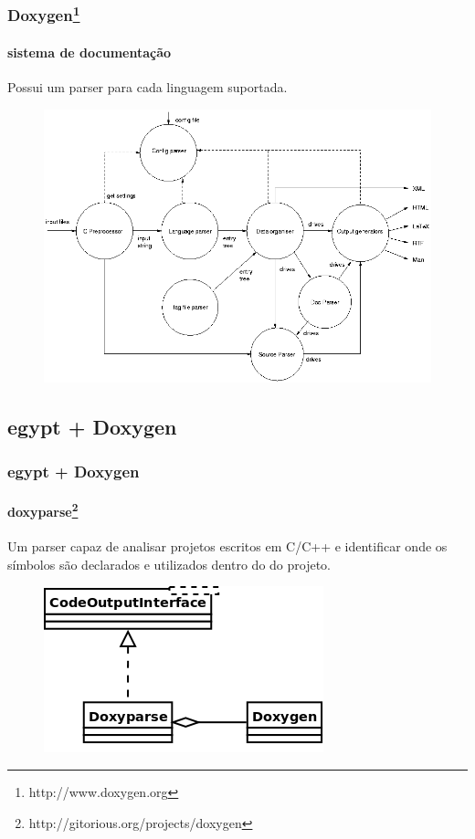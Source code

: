 \documentclass{beamer}
\begin{document}
\begin{frame}
\frametitle{Doxygen\footnote{http://www.doxygen.org}}
\framesubtitle{sistema de documentação}
 Possui um parser para cada linguagem suportada.
 \begin{figure}[h]
 \center
 \includegraphics[scale=0.25]{imagens/doxygen-internals-flow}
 \label{fig:doxygen-internals-flow}
 \end{figure}
\end{frame}

\subsection{egypt + Doxygen}

\begin{frame}
\frametitle{egypt + Doxygen}
\framesubtitle{doxyparse\footnote{http://gitorious.org/projects/doxygen}}
 Um parser capaz de analisar projetos escritos em C/C++ e identificar onde os
 símbolos são declarados e utilizados dentro do do projeto.
 \begin{figure}[h]
 \center
 \includegraphics[scale=0.3]{imagens/doxyparse-diagram}
 \label{doxyparse-diagram}
 \end{figure}
\end{frame}
\end{document}
